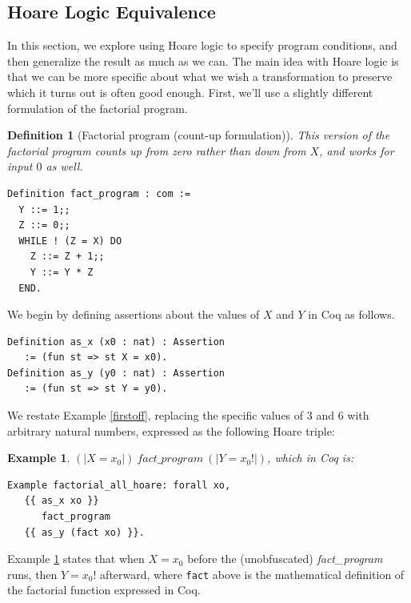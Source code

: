 \documentclass[compsoc,conference,a4paper,10pt,times]{IEEEtran}
\newtheorem{defin}[theorem]{Definition}
\newtheorem{example}[theorem]{Example}
\begin{document}
\subsection{Hoare Logic Equivalence}\label{hoarequiv}

In this section, we explore using Hoare logic to specify program conditions, and then generalize the result as much as we can.  The main idea with Hoare logic is that we can be more specific about what we wish a transformation to preserve which it turns out is often good enough. %
First, we'll use a slightly different formulation of the factorial program.

\begin{defin}[Factorial program (count-up formulation)]\label{def:factup}
This version of the factorial program counts up from zero rather than down from $X$, and works for input $0$ as well.
\begin{verbatim}
Definition fact_program : com :=
  Y ::= 1;;
  Z ::= 0;;
  WHILE ! (Z = X) DO
    Z ::= Z + 1;;
    Y ::= Y * Z
  END.
\end{verbatim}
\end{defin}

We begin by defining assertions about the values of $X$ and $Y$ in Coq as follows.
\begin{verbatim}
Definition as_x (x0 : nat) : Assertion 
   := (fun st => st X = x0).
Definition as_y (y0 : nat) : Assertion 
   := (fun st => st Y = y0).
\end{verbatim}
We restate Example \ref{firstoff}, replacing the specific values of $3$ and $6$ with arbitrary natural numbers, expressed as the following Hoare triple:
\begin{example}\label{hoareexample1}
    $
     (|X=x_0|)\ fact\_program\ (|Y=x_0!|)
    $,
which in Coq is:
\begin{verbatim}
Example factorial_all_hoare: forall xo,
   {{ as_x xo }} 
      fact_program 
   {{ as_y (fact xo) }}.
\end{verbatim}
\end{example}
Example \ref{hoareexample1} states that when $X = x_0$ before the (unobfuscated) \textit{fact\_program} runs, then $Y = x_0!$ afterward,
where \texttt{fact} above is the mathematical definition of the factorial function expressed in Coq.
\end{document}
